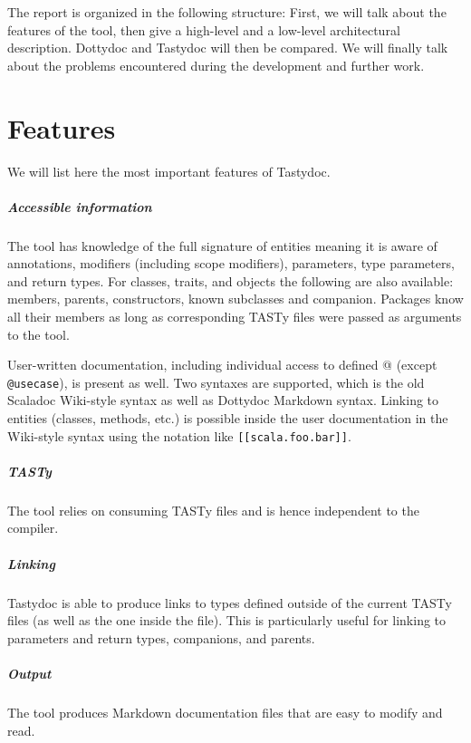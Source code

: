 \documentclass{report}
\begin{document}
The report is organized in the following structure: First, we will talk about the features of the tool, then give a high-level and a low-level architectural description. Dottydoc and Tastydoc will then be compared. We will finally talk about the problems encountered during the development and further work.

\chapter{Features}
We will list here the most important features of Tastydoc.

\paragraph{Accessible information}
The tool has knowledge of the full signature of entities meaning it is aware of annotations, modifiers (including scope modifiers), parameters, type parameters, and return types.
For classes, traits, and objects the following are also available: members, parents, constructors, known subclasses and companion.
Packages know all their members as long as corresponding TASTy files were passed as arguments to the tool.

User-written documentation, including individual access to defined @ (except \texttt{@usecase}), is present as well. Two syntaxes are supported, which is the old Scaladoc Wiki-style syntax as well as Dottydoc Markdown syntax. Linking to entities (classes, methods, etc.) is possible inside the user documentation in the Wiki-style syntax using the notation like \texttt{[[scala.foo.bar]]}.

\paragraph{TASTy}
The tool relies on consuming TASTy files and is hence independent to the compiler.

\paragraph{Linking}
Tastydoc is able to produce links to types defined outside of the current TASTy files (as well as the one inside the file). This is particularly useful for linking to parameters and return types, companions, and parents.

\paragraph{Output}
The tool produces Markdown documentation files that are easy to modify and read.
\end{document}
